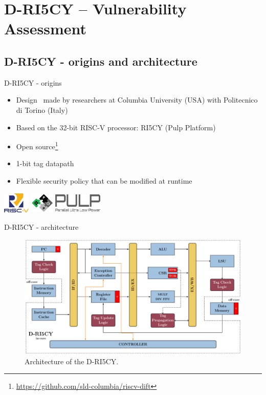 \section{D-RI5CY -- Vulnerability Assessment}

\subsection{D-RI5CY - origins and architecture}
\begin{frame}{D-RI5CY - origins}
    \begin{itemize}
        \item Design~\cite{PDGLC-18-hpec} made by researchers at Columbia University (USA) with Politecnico di Torino (Italy)
        \item Based on the 32-bit RISC-V processor: RI5CY (Pulp Platform)
        \item Open source\footnote{\url{https://github.com/sld-columbia/riscv-dift}}
        \item 1-bit tag datapath
        \item Flexible security policy that can be modified at runtime
    \end{itemize}

    \centering
    \vfill
    \includegraphics[height=1cm]{img/logo/riscv.png}
    \hspace{1cm}
    \includegraphics[height=1cm]{img/logo/pulp_logo.pdf}
    \vfill
\end{frame}
\begin{frame}{D-RI5CY - architecture}
    \begin{figure}
        \centering
        \includegraphics[width=.9\textwidth]{src/2_vuln_assessment/img/RI5CY.pdf}
        \caption{Architecture of the D-RI5CY.}
        \label{fig:riscy}
    \end{figure}
\end{frame}
